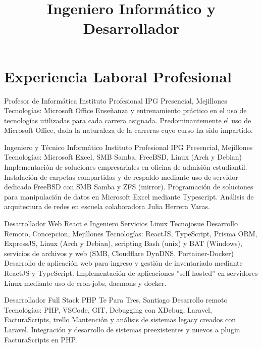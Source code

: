 \documentclass[draft,color,12pt,letterpaper,sans]{moderncv}
\title {Ingeniero Inform\'atico y Desarrollador}
\begin{document}
\makecvtitle %

\section{Experiencia Laboral Profesional}



{Profesor de Inform\'atica}
{Instituto Profesional IPG}
{\newline Presencial, Mejillones}
{\newline Tecnolog\'ias: Microsoft Office}
{Enseñanza y entrenamiento pr\'actico en el uso de tecnolog\'ias utilizadas para cada carrera asignada. Predominantemente el uso de Microsoft Office, dada la naturaleza de la carreras cuyo curso ha sido impartido.\newline}

{Ingeniero y T\'ecnico Inform\'atico}
{Instituto Profesional IPG}
{\newline Presencial, Mejillones}
{\newline Tecnolog\'ias: Microsoft Excel, SMB Samba, FreeBSD, Linux (Arch y Debian)}
{Implementaci\'on de soluciones empresariales en oficina de  admisi\'on estudiantil. Instalaci\'on de carpetas compartidas y de respaldo mediante uso de servidor dedicado FreeBSD con SMB Samba y ZFS (mirror). Programaci\'on de soluciones para manipulaci\'on de datos en Microsoft Excel mediante Typescript. An\'alisis de arquitectura de redes en escuela colaboradora Julia Herrera Varas.\newline}


{Desarrollador Web React e Ingeniero Servicios Linux}
{Tecnojosue}
{\newline Desarrollo Remoto, Concepcion, Mejillones}
{\newline Tecnolog\'ias:  ReactJS, TypeScript, Prisma ORM, ExpressJS, Linux (Arch y Debian), scripting Bash (unix) y BAT (Windows), servicios de archivos y web (SMB, Cloudflare DynDNS, Portainer-Docker)}
{Desarrollo de aplicación web para ingreso y gestión de inventariado mediante ReactJS y TypeScript. Implementación de aplicaciones ”self hosted” en servidores Linux mediante uso de cron-jobs, daemons y docker.\newline}

{Desarrollador Full Stack PHP}
{Te Para Tres, Santiago}
{\newline Desarrollo remoto}
{\newline Tecnolog\'ias: PHP, VSCode, GIT, Debugging con XDebug, Laravel, FacturaScripts, trello}
{Mantenci\'on y an\'alisis de sistemas legacy creados con Laravel. Integraci\'on y desarrollo de sistemas preexistentes y nuevos a plugin FacturaScripts en PHP.\newline}
\end{document}
